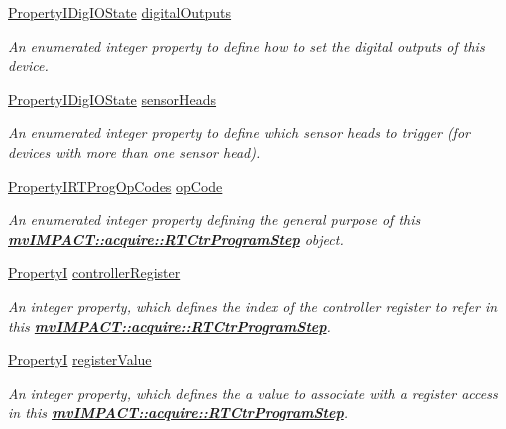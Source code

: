 \begin{DoxyCompactItemize}
\hyperlink{group___device_specific_interface_ga26369d2e6b583ee092988de00a839413}{Property\+I\+Dig\+I\+O\+State} \hyperlink{classmv_i_m_p_a_c_t_1_1acquire_1_1_r_t_ctr_program_step_a9ccd96117b14e3031c38a59f6cf6595c}{digital\+Outputs}
\begin{DoxyCompactList}\small\item\em An enumerated integer property to define how to set the digital outputs of this device. \end{DoxyCompactList}\item 
\hyperlink{group___device_specific_interface_ga26369d2e6b583ee092988de00a839413}{Property\+I\+Dig\+I\+O\+State} \hyperlink{classmv_i_m_p_a_c_t_1_1acquire_1_1_r_t_ctr_program_step_a1bdc2bfbec5bd9680753a3aa3d6ed483}{sensor\+Heads}
\begin{DoxyCompactList}\small\item\em An enumerated integer property to define which sensor heads to trigger (for devices with more than one sensor head). \end{DoxyCompactList}\item 
\hyperlink{group___device_specific_interface_gaa22518faa79c768c8c1cbf763bc0dec7}{Property\+I\+R\+T\+Prog\+Op\+Codes} \hyperlink{classmv_i_m_p_a_c_t_1_1acquire_1_1_r_t_ctr_program_step_a823c9cad26ad628155d68130ad1d6d5d}{op\+Code}
\begin{DoxyCompactList}\small\item\em An enumerated integer property defining the general purpose of this {\bfseries \hyperlink{classmv_i_m_p_a_c_t_1_1acquire_1_1_r_t_ctr_program_step}{mv\+I\+M\+P\+A\+C\+T\+::acquire\+::\+R\+T\+Ctr\+Program\+Step}} object. \end{DoxyCompactList}\item 
\hyperlink{group___common_interface_ga12d5e434238ca242a1ba4c6c3ea45780}{Property\+I} \hyperlink{classmv_i_m_p_a_c_t_1_1acquire_1_1_r_t_ctr_program_step_af6109b0aa37200c31f2bbeecd5f2eec8}{controller\+Register}
\begin{DoxyCompactList}\small\item\em An integer property, which defines the index of the controller register to refer in this {\bfseries \hyperlink{classmv_i_m_p_a_c_t_1_1acquire_1_1_r_t_ctr_program_step}{mv\+I\+M\+P\+A\+C\+T\+::acquire\+::\+R\+T\+Ctr\+Program\+Step}}. \end{DoxyCompactList}\item 
\hyperlink{group___common_interface_ga12d5e434238ca242a1ba4c6c3ea45780}{Property\+I} \hyperlink{classmv_i_m_p_a_c_t_1_1acquire_1_1_r_t_ctr_program_step_aa4a8088b0cb951026c8a290b82bc6657}{register\+Value}
\begin{DoxyCompactList}\small\item\em An integer property, which defines the a value to associate with a register access in this {\bfseries \hyperlink{classmv_i_m_p_a_c_t_1_1acquire_1_1_r_t_ctr_program_step}{mv\+I\+M\+P\+A\+C\+T\+::acquire\+::\+R\+T\+Ctr\+Program\+Step}}. \end{DoxyCompactList}\end{DoxyCompactItemize}
